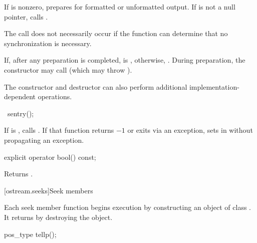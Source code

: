 \begin{itemdescr}
\pnum
If
is nonzero, prepares for formatted or unformatted output.
If
is not a null pointer, calls
%
.%
\begin{footnote}
The call
does not necessarily occur if the function can determine that no
synchronization is necessary.
\end{footnote}

\pnum
If, after any preparation is completed,
is
,
otherwise,
.
During preparation, the constructor may call
(which may throw
).
\begin{footnote}
The
constructor and destructor
can also perform additional
%
implementation-dependent operations.
\end{footnote}
\end{itemdescr}

%
\begin{itemdecl}
~sentry();
\end{itemdecl}

\begin{itemdescr}
\pnum
If
is
,
calls
. If that function returns $-1$ or
exits via an exception, sets  in
 without propagating an exception.
\end{itemdescr}

%
\begin{itemdecl}
explicit operator bool() const;
\end{itemdecl}

\begin{itemdescr}
\pnum
\effects
Returns
.
\end{itemdescr}

[ostream.seeks]{Seek members}

\pnum
Each seek member function begins execution by constructing an object of class .
It returns by destroying the  object.

%
\begin{itemdecl}
pos_type tellp();
\end{itemdecl}

